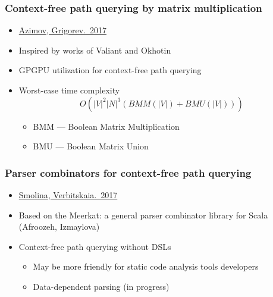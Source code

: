 \documentclass[xcolor=table]{beamer}
\begin{document}
\begin{frame}
  \transwipe[direction=90]
  \frametitle{Context-free path querying by matrix multiplication}
  \begin{itemize}
    \item \href{https://arxiv.org/abs/1707.01007}{Azimov, Grigorev.~2017}
    \item Inspired by works of Valiant and Okhotin    
    \item GPGPU utilization for context-free path querying
    \item Worst-case time complexity $$O(|V|^2 |N|^3 (BMM(|V|) + BMU(|V|)))$$
    \begin{itemize}
      \item BMM --- Boolean Matrix Multiplication
      \item BMU --- Boolean Matrix Union
    \end{itemize}

  \end{itemize}
\end{frame}

\begin{frame}
  \transwipe[direction=90]
  \frametitle{Parser combinators for context-free path querying}
  \begin{itemize}
    \item \href{http://plc.sfedu.ru/files/PLC-2017-proceedings.pdf\#page=233}{Smolina, Verbitskaia.~2017}
    \item Based on the Meerkat: a general parser combinator library for Scala (Afroozeh, Izmaylova)
    \item Context-free path querying without DSLs
    \begin{itemize}
    \item May be more friendly for static code analysis tools developers
    \item Data-dependent parsing (in progress)
    \end{itemize}
  \end{itemize}
\end{frame}
\end{document}
